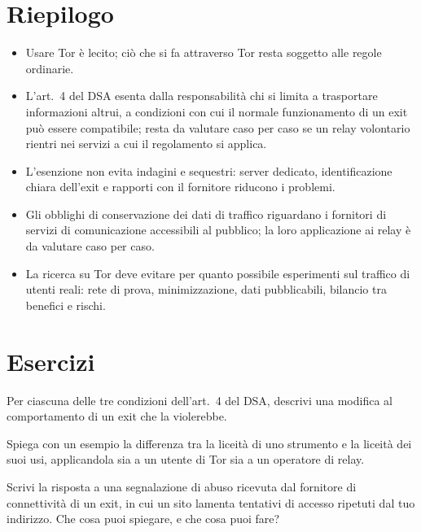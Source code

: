 \section*{Riepilogo}
\begin{itemize}
  \item Usare Tor è lecito; ciò che si fa attraverso Tor resta soggetto alle regole ordinarie.
  \item L'art.~4 del DSA esenta dalla responsabilità chi si limita a trasportare informazioni altrui, a condizioni con cui il normale funzionamento di un exit può essere compatibile; resta da valutare caso per caso se un relay volontario rientri nei servizi a cui il regolamento si applica.
  \item L'esenzione non evita indagini e sequestri: server dedicato, identificazione chiara dell'exit e rapporti con il fornitore riducono i problemi.
  \item Gli obblighi di conservazione dei dati di traffico riguardano i fornitori di servizi di comunicazione accessibili al pubblico; la loro applicazione ai relay è da valutare caso per caso.
  \item La ricerca su Tor deve evitare per quanto possibile esperimenti sul traffico di utenti reali: rete di prova, minimizzazione, dati pubblicabili, bilancio tra benefici e rischi.
\end{itemize}

\section*{Esercizi}

\begin{esercizio}[1]\label{es:25-condizioni}
Per ciascuna delle tre condizioni dell'art.~4 del DSA, descrivi una modifica al comportamento di un exit che la violerebbe.
\end{esercizio}

\begin{esercizio}[1]\label{es:25-strumento}
Spiega con un esempio la differenza tra la liceità di uno strumento e la liceità dei suoi usi, applicandola sia a un utente di Tor sia a un operatore di relay.
\end{esercizio}

\begin{esercizio}[2]\label{es:25-segnalazione}
Scrivi la risposta a una segnalazione di abuso ricevuta dal fornitore di connettività di un exit, in cui un sito lamenta tentativi di accesso ripetuti dal tuo indirizzo. Che cosa puoi spiegare, e che cosa puoi fare?
\end{esercizio}


